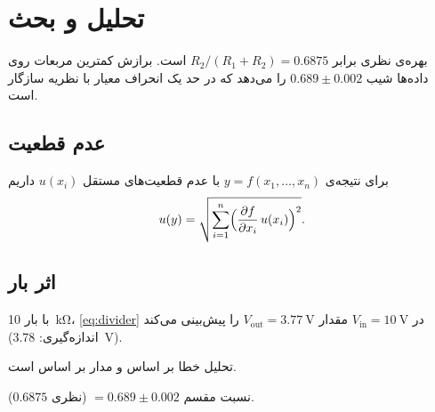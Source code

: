 \section{تحلیل و بحث}

بهره‌ی نظری برابر $R_2/(R_1+R_2)=0.6875$ است. برازش کمترین مربعات روی داده‌ها شیب
$0.689\pm0.002$ را می‌دهد که در حد یک انحراف معیار با نظریه سازگار است.

\subsection{عدم قطعیت}
برای نتیجه‌ی $y=f(x_1,\dots,x_n)$ با عدم قطعیت‌های مستقل $u(x_i)$ داریم
\begin{equation}\label{eq:uncertainty}
  u(y)=\sqrt{\sum_{i=1}^{n}\Bigl(\frac{\partial f}{\partial x_i}\,u(x_i)\Bigr)^{2}}.
\end{equation}

\subsection{اثر بار}
با بار \qty{10}{\kilo\ohm}، \cref{eq:divider} در $V_\mathrm{in}=\qty{10}{\volt}$ مقدار $V_\mathrm{out}=\qty{3.77}{\volt}$ را پیش‌بینی می‌کند (اندازه‌گیری: \qty{3.78}{\volt}).

تحلیل خطا بر اساس \cite{taylor1997} و مدار بر اساس \cite{horowitz2015} است.

\begin{resultbox}[نتیجه]
نسبت مقسم $=0.689\pm0.002$ (نظری $0.6875$).
\end{resultbox}
